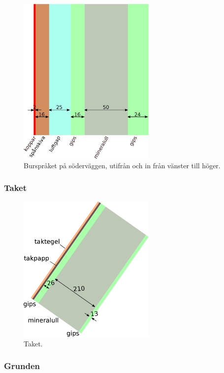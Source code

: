 \begin{figure}[hpbt]
\centering
\includegraphics[width=0.6\textwidth]{images/bursprak.eps}
\caption{\label{fig:sodervagg}{Burspråket på söderväggen, utifrån och in från vänster till höger.}}
\end{figure}

\subsubsection{Taket}

\begin{figure}[hpbt]
\centering
\includegraphics[width=0.6\textwidth]{images/taket.eps}
\caption{\label{fig:sodervagg}{Taket.}}
\end{figure}

\subsubsection{Grunden}


